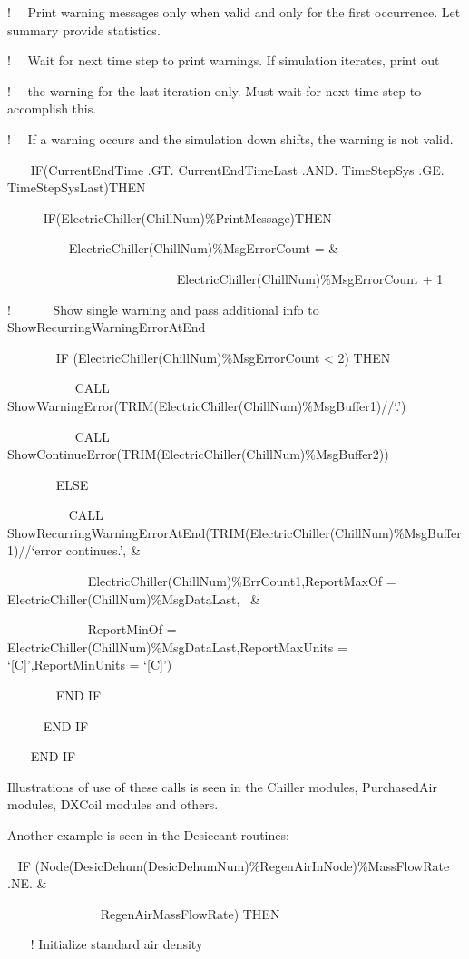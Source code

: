 !~~ Print warning messages only when valid and only for the first occurrence. Let summary provide statistics.

!~~ Wait for next time step to print warnings. If simulation iterates, print out

!~~ the warning for the last iteration only. Must wait for next time step to accomplish this.

!~~ If a warning occurs and the simulation down shifts, the warning is not valid.

~~~ IF(CurrentEndTime .GT. CurrentEndTimeLast .AND. TimeStepSys .GE. TimeStepSysLast)THEN

~~~~~ IF(ElectricChiller(ChillNum)\%PrintMessage)THEN

~~~~~~~~~ ElectricChiller(ChillNum)\%MsgErrorCount = \&

~~~~~~~~~~~~~~~~~~~~~~~~~~ ElectricChiller(ChillNum)\%MsgErrorCount + 1

!~~~~~~ Show single warning and pass additional info to ShowRecurringWarningErrorAtEnd

~~~~~~~ IF (ElectricChiller(ChillNum)\%MsgErrorCount \textless{} 2) THEN

~~~~~~~~~~ CALL ShowWarningError(TRIM(ElectricChiller(ChillNum)\%MsgBuffer1)//`.')

~~~~~~~~~~ CALL ShowContinueError(TRIM(ElectricChiller(ChillNum)\%MsgBuffer2))

~~~~~~~ ELSE

~~~~~~~~~ CALL ShowRecurringWarningErrorAtEnd(TRIM(ElectricChiller(ChillNum)\%MsgBuffer1)//`error continues.', \&

~~~~~~~~~~~~ ElectricChiller(ChillNum)\%ErrCount1,ReportMaxOf = ElectricChiller(ChillNum)\%MsgDataLast,~ \&

~~~~~~~~~~~~ ReportMinOf = ElectricChiller(ChillNum)\%MsgDataLast,ReportMaxUnits = `{[}C{]}',ReportMinUnits = `{[}C{]}')

~~~~~~~ END IF

~~~~~ END IF

~~~ END IF

Illustrations of use of these calls is seen in the Chiller modules, PurchasedAir modules, DXCoil modules and others.

Another example is seen in the Desiccant routines:

~ IF (Node(DesicDehum(DesicDehumNum)\%RegenAirInNode)\%MassFlowRate .NE. \&

~~~~~~~~~~~~~~ RegenAirMassFlowRate) THEN

~~~ ! Initialize standard air density

